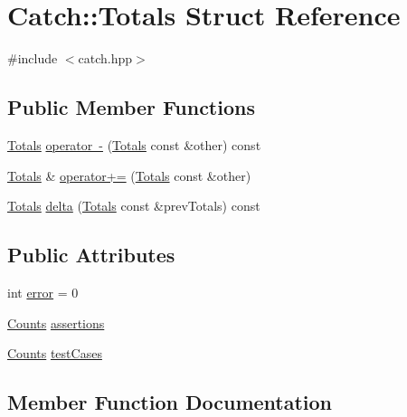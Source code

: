 \hypertarget{struct_catch_1_1_totals}{}\section{Catch\+::Totals Struct Reference}
\label{struct_catch_1_1_totals}


{\ttfamily \#include $<$catch.\+hpp$>$}

\subsection*{Public Member Functions}
\begin{DoxyCompactItemize}
\item 
\mbox{\hyperlink{struct_catch_1_1_totals}{Totals}} \mbox{\hyperlink{struct_catch_1_1_totals_a4e78ceccf9473cbb117e1803907e174d}{operator -\/}} (\mbox{\hyperlink{struct_catch_1_1_totals}{Totals}} const \&other) const
\item 
\mbox{\hyperlink{struct_catch_1_1_totals}{Totals}} \& \mbox{\hyperlink{struct_catch_1_1_totals_a574015076e54cc405c70b053e3356e43}{operator+=}} (\mbox{\hyperlink{struct_catch_1_1_totals}{Totals}} const \&other)
\item 
\mbox{\hyperlink{struct_catch_1_1_totals}{Totals}} \mbox{\hyperlink{struct_catch_1_1_totals_a1a94a654f5f3786b75695e081fc9bca2}{delta}} (\mbox{\hyperlink{struct_catch_1_1_totals}{Totals}} const \&prev\+Totals) const
\end{DoxyCompactItemize}
\subsection*{Public Attributes}
\begin{DoxyCompactItemize}
\item 
int \mbox{\hyperlink{struct_catch_1_1_totals_a6ea14c7de7ea735a14f172a26e08a239}{error}} = 0
\item 
\mbox{\hyperlink{struct_catch_1_1_counts}{Counts}} \mbox{\hyperlink{struct_catch_1_1_totals_a885ded66df752147b30c3d45aa602ec9}{assertions}}
\item 
\mbox{\hyperlink{struct_catch_1_1_counts}{Counts}} \mbox{\hyperlink{struct_catch_1_1_totals_adb195fe477aedee2ecea88c888f16506}{test\+Cases}}
\end{DoxyCompactItemize}


\subsection{Member Function Documentation}
\mbox{\label{struct_catch_1_1_totals_a1a94a654f5f3786b75695e081fc9bca2}} 
